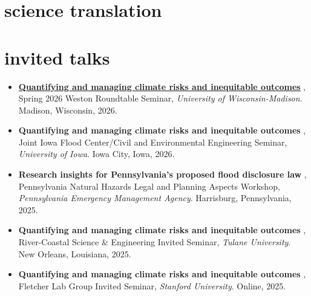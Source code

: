\documentclass[10pt,oneside]{article}
\begin{document}
\section{science translation}

\mbox{}\vspace{-\dimexpr\baselineskip\relax}
\vspace*{-1em}
\printbibliography[type=misc, heading=none]


\section{invited talks}

\mbox{}\vspace{-\dimexpr\baselineskip\relax}

\begin{itemize}[label={}]
  
  \item

\href{https://mediaspace.wisc.edu/media/Adam+Pollack%3A+Quantifying+and+Managing+Climate+Risks+and+Inequitable+Outcomes+%28April+16%2C+2026%29/1_4oim5ivt/399931653}{\textbf{Quantifying and managing climate risks and inequitable outcomes}}
, Spring 2026 Weston Roundtable Seminar, \textit{University of Wisconsin-Madison}. Madison, Wisconsin, 2026.
  
  \item

\textbf{Quantifying and managing climate risks and inequitable outcomes}
, Joint Iowa Flood Center/Civil and Environmental Engineering Seminar, \textit{University of Iowa}. Iowa City, Iowa, 2026.
  
  \item

\textbf{Research insights for Pennsylvania’s proposed flood disclosure law}
, Pennsylvania Natural Hazards Legal and Planning Aspects Workshop, \textit{Pennsylvania Emergency Management Agency}. Harrisburg, Pennsylvania, 2025.
  
  \item

\textbf{Quantifying and managing climate risks and inequitable outcomes}
, River-Coastal Science \& Engineering Invited Seminar, \textit{Tulane University}. New Orleans, Louisiana, 2025.
  
  \item

\textbf{Quantifying and managing climate risks and inequitable outcomes}
, Fletcher Lab Group Invited Seminar, \textit{Stanford University}. Online, 2025.
  

\end{itemize}
\end{document}
